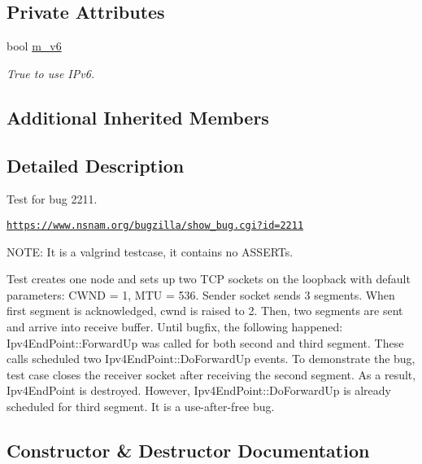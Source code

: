 \subsection*{Private Attributes}
\begin{DoxyCompactItemize}
\item 
bool \hyperlink{classTcpEndPointBug2211Test_a187eb7cee3ee1550d773cab9bd1ccfc4}{m\+\_\+v6}
\begin{DoxyCompactList}\small\item\em True to use I\+Pv6. \end{DoxyCompactList}\end{DoxyCompactItemize}
\subsection*{Additional Inherited Members}


\subsection{Detailed Description}
Test for bug 2211. 

\href{https://www.nsnam.org/bugzilla/show_bug.cgi?id=2211}{\tt https\+://www.\+nsnam.\+org/bugzilla/show\+\_\+bug.\+cgi?id=2211}

N\+O\+TE\+: It is a valgrind testcase, it contains no A\+S\+S\+E\+R\+Ts.

Test creates one node and sets up two T\+CP sockets on the loopback with default parameters\+: C\+W\+ND = 1, M\+TU = 536. Sender socket sends 3 segments. When first segment is acknowledged, cwnd is raised to 2. Then, two segments are sent and arrive into receive buffer. Until bugfix, the following happened\+: Ipv4\+End\+Point\+::\+Forward\+Up was called for both second and third segment. These calls scheduled two Ipv4\+End\+Point\+::\+Do\+Forward\+Up events. To demonstrate the bug, test case closes the receiver socket after receiving the second segment. As a result, Ipv4\+End\+Point is destroyed. However, Ipv4\+End\+Point\+::\+Do\+Forward\+Up is already scheduled for third segment. It is a use-\/after-\/free bug. 

\subsection{Constructor \& Destructor Documentation}
